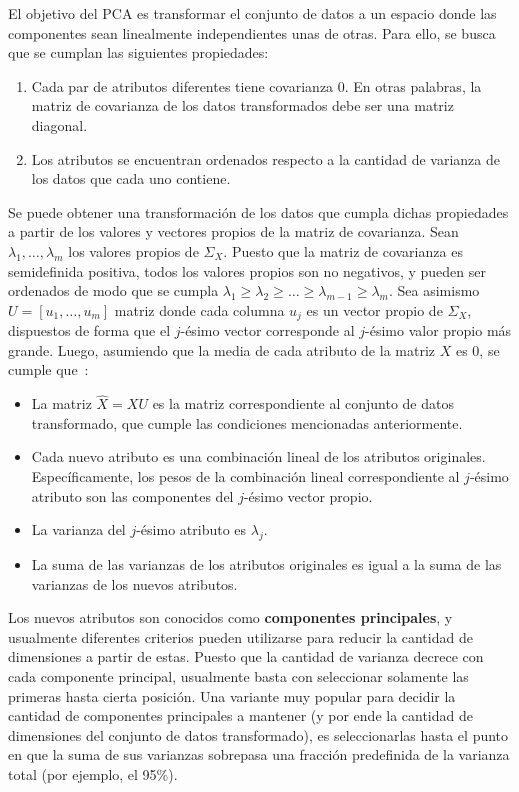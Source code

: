 El objetivo del PCA es transformar el conjunto de datos a un espacio donde las componentes sean linealmente independientes unas de otras.
Para ello, se busca que se cumplan las siguientes propiedades:

\begin{enumerate}
    \item Cada par de atributos diferentes tiene covarianza 0.
    En otras palabras, la matriz de covarianza de los datos transformados debe ser una matriz diagonal.
    \item Los atributos se encuentran ordenados respecto a la cantidad de varianza de los datos que cada uno contiene.
\end{enumerate}

Se puede obtener una transformación de los datos que cumpla dichas propiedades a partir de los valores y vectores propios de la matriz de covarianza.
Sean $\lambda_1,\dots,\lambda_m$ los valores propios de $\Sigma_X$.
Puesto que la matriz de covarianza es semidefinida positiva, todos los valores propios son no negativos, y pueden ser ordenados de modo que se cumpla $\lambda_1 \geq \lambda_2 \geq \dots \geq \lambda_{m-1} \geq \lambda_m$.
Sea asimismo $U = [u_1,\dots,u_m]$ matriz donde cada columna $u_j$ es un vector propio de $\Sigma_X$, dispuestos de forma que el $j$-ésimo vector corresponde al $j$-ésimo valor propio más grande.
Luego, asumiendo que la media de cada atributo de la matriz $X$ es 0, se cumple que~\cite{Smith02,Tan05}:

\begin{itemize}
    \item La matriz $\hat{X} = XU$ es la matriz correspondiente al conjunto de datos transformado, que cumple las condiciones mencionadas anteriormente.
    \item Cada nuevo atributo es una combinación lineal de los atributos originales. Específicamente, los pesos de la combinación lineal correspondiente al $j$-ésimo atributo son las componentes del $j$-ésimo vector propio.
    \item La varianza del $j$-ésimo atributo es $\lambda_j$.
    \item La suma de las varianzas de los atributos originales es igual a la suma de las varianzas de los nuevos atributos.
\end{itemize}

Los nuevos atributos son conocidos como \textbf{componentes principales}, y usualmente diferentes criterios pueden utilizarse para reducir la cantidad de dimensiones a partir de estas.
Puesto que la cantidad de varianza decrece con cada componente principal, usualmente basta con seleccionar solamente las primeras hasta cierta posición.
Una variante muy popular para decidir la cantidad de componentes principales a mantener (y por ende la cantidad de dimensiones del conjunto de datos transformado), es seleccionarlas hasta el punto en que la suma de sus varianzas sobrepasa una fracción predefinida de la varianza total (por ejemplo, el 95\%).
